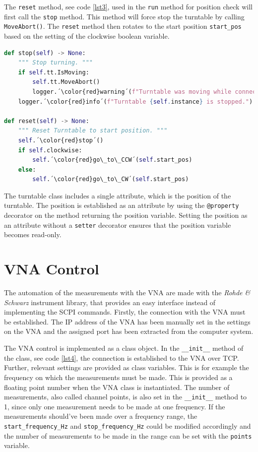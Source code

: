 The \verb+reset+ method, see code \ref{lst3}, used in the \verb+run+ method for position check will first call the \verb+stop+ method. This method will force stop the turntable by calling \verb+MoveAbort()+. The \verb+reset+ method then rotates to the start position \verb+start_pos+ based on the setting of the clockwise boolean variable.

\begin{lstlisting}[language=Python, caption=Method for resetting the turntable to start position.]
def stop(self) -> None:
    """ Stop turning. """
    if self.tt.IsMoving:
        self.tt.MoveAbort()
        logger.´\color{red}warning´(f"Turntable was moving while connection was stopped for {self.instance}.")
    logger.´\color{red}info´(f"Turntable {self.instance} is stopped.")

def reset(self) -> None:
    """ Reset Turntable to start position. """
    self.´\color{red}stop´()
    if self.clockwise:
        self.´\color{red}go\_to\_CCW´(self.start_pos)
    else:
        self.´\color{red}go\_to\_CW´(self.start_pos)
\end{lstlisting} \label{lst3}

The turntable class includes a single attribute, which is the position of the turntable. The position is established as an attribute by using the \verb+@property+ decorator on the method returning the position variable. Setting the position as an attribute without a \verb+setter+ decorator ensures that the position variable becomes read-only. 

\section{VNA Control}
The automation of the measurements with the VNA are made with the \textit{Rohde \& Schwarz} instrument library, that provides an easy interface instead of implementing the SCPI commands. Firstly, the connection with the VNA must be established. The IP address of the VNA has been manually set in the settings on the VNA and the assigned port has been extracted from the computer system. 

The VNA control is implemented as a class object. In the \verb+__init__+ method of the class, see code \ref{lst4}, the connection is established to the VNA over TCP. Further, relevant settings are provided as class variables. This is for example the frequency on which the measurements must be made. This is provided as a floating point number when the VNA class is instantiated. The number of measurements, also called channel points, is also set in the \verb+__init__+ method to 1, since only one measurement needs to be made at one frequency. If the measurements should've been made over a frequency range, the \verb+start_frequency_Hz+ and \verb+stop_frequency_Hz+ could be modified accordingly and the number of measurements to be made in the range can be set with the \verb+points+ variable.

